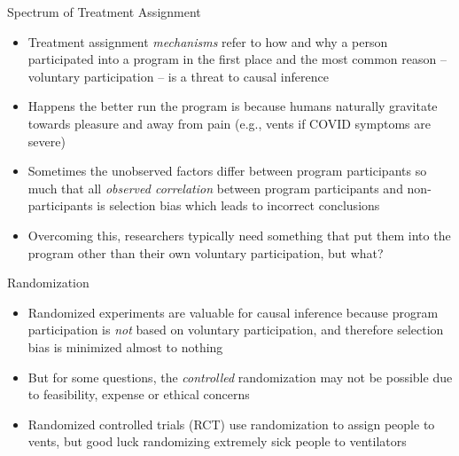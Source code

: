 \documentclass{beamer}
\begin{document}

  




\begin{frame}{Spectrum of Treatment Assignment}

\begin{itemize}

\item Treatment assignment \emph{mechanisms} refer to how and why a person participated into a program in the first place and the most common reason -- voluntary participation -- is a threat to causal inference
\item Happens the better run the program is because humans naturally gravitate towards pleasure and away from pain (e.g., vents if COVID symptoms are severe)
\item Sometimes the unobserved factors differ between program participants so much that all \emph{observed correlation} between program participants and non-participants is selection bias which leads to incorrect conclusions
\item Overcoming this, researchers typically need something that put them into the program other than their own voluntary participation, but what?

\end{itemize}

\end{frame}




\begin{frame}{Randomization}
\begin{center}
\end{center}

\bigskip

\begin{itemize}
\item Randomized experiments are valuable for causal inference because program participation is \emph{not} based on voluntary participation, and therefore selection bias is minimized almost to nothing
\item But for some questions, the \emph{controlled} randomization may not be possible due to feasibility, expense or ethical concerns
\item Randomized controlled trials (RCT) use randomization to assign people to vents, but good luck randomizing extremely sick people to ventilators
\end{itemize}



\end{frame}
\end{document}
